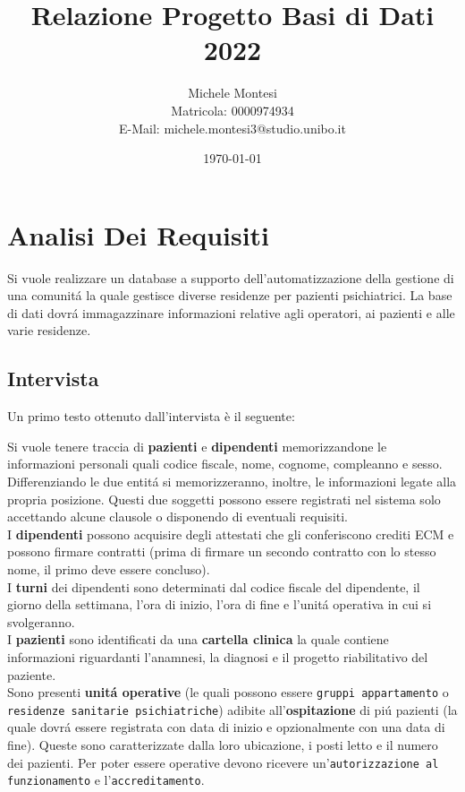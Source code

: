 \documentclass[a4paper, 12pt]{report}
\title{Relazione Progetto Basi di Dati 2022}
\author{Michele Montesi \\
        Matricola: 0000974934 \\
        E-Mail: michele.montesi3@studio.unibo.it}
\date{\today}
\newenvironment{changemargin}[2]{%
  \begin{list}{}{%
    \setlength{\topsep}{0pt}%
    \setlength{\leftmargin}{#1}%
    \setlength{\rightmargin}{#2}%
    \setlength{\listparindent}{\parindent}%
    \setlength{\itemindent}{\parindent}%
    \setlength{\parsep}{\parskip}%
  }%
  \item[]}{\end{list}}
\begin{document}
    
\maketitle
\tableofcontents

\chapter{Analisi Dei Requisiti}
Si vuole realizzare un database a supporto dell'automatizzazione della gestione di una
comunitá la quale gestisce diverse residenze per pazienti psichiatrici.
La base di dati dovrá immagazzinare informazioni relative agli operatori, ai pazienti e
alle varie residenze.

\section{Intervista}
Un primo testo ottenuto dall'intervista è il seguente:

\begin{changemargin}{1cm}{1cm}
        Si vuole tenere traccia di \textbf{pazienti} e \textbf{dipendenti} memorizzandone le informazioni personali
        quali codice fiscale, nome, cognome, compleanno e sesso. Differenziando le due entitá
        si memorizzeranno, inoltre, le informazioni legate alla propria posizione.
        Questi due soggetti possono essere registrati nel sistema solo accettando alcune clausole o
        disponendo di eventuali requisiti.\\
        I \textbf{dipendenti} possono acquisire degli attestati che gli conferiscono crediti ECM e possono firmare
        contratti (prima di firmare un secondo contratto con lo stesso nome, il primo deve essere concluso).\\
        I \textbf{turni} dei dipendenti sono determinati dal codice fiscale del dipendente, il giorno della settimana, 
        l'ora di inizio, l'ora di fine e l'unitá operativa in cui si svolgeranno.\\
        I \textbf{pazienti} sono identificati da una \textbf{cartella clinica} la quale contiene informazioni riguardanti
        l'anamnesi, la diagnosi e il progetto riabilitativo del paziente.\\
        Sono presenti \textbf{unitá operative} (le quali possono essere \texttt{gruppi appartamento} o \texttt{residenze
        sanitarie psichiatriche}) adibite all'\textbf{ospitazione} di piú pazienti (la quale dovrá essere registrata 
        con data di inizio e opzionalmente con una data di fine). Queste sono caratterizzate dalla loro
        ubicazione, i posti letto e il numero dei pazienti. Per poter essere operative devono ricevere
        un'\texttt{autorizzazione al funzionamento} e l'\texttt{accreditamento}.
\end{changemargin}
\end{document}
